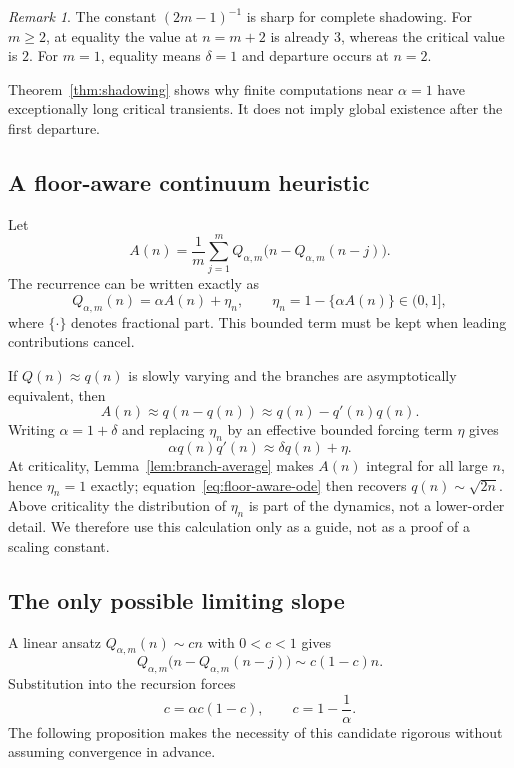 \documentclass[11pt]{article}
\theoremstyle{definition}
\theoremstyle{remark}
\newtheorem{remark}[theorem]{Remark}
\begin{document}
\begin{remark}
The constant $(2m-1)^{-1}$ is sharp for complete shadowing.  For $m\ge2$,
at equality the value at $n=m+2$ is already $3$, whereas the critical value
is $2$.  For $m=1$, equality means $\delta=1$ and departure occurs at $n=2$.
\end{remark}

Theorem~\ref{thm:shadowing} shows why finite computations near $\alpha=1$
have exceptionally long critical transients.  It does not imply global
existence after the first departure.

\subsection{A floor-aware continuum heuristic}

Let
\[
A(n)=\frac1m\sum_{j=1}^{m}
Q_{\alpha,m}\bigl(n-Q_{\alpha,m}(n-j)\bigr).
\]
The recurrence can be written exactly as
\begin{equation}\label{eq:floor-defect}
Q_{\alpha,m}(n)=\alpha A(n)+\eta_n,
\qquad
\eta_n=1-\{\alpha A(n)\}\in(0,1],
\end{equation}
where $\{\cdot\}$ denotes fractional part.  This bounded term must be kept
when leading contributions cancel.

If $Q(n)\approx q(n)$ is slowly varying and the branches are asymptotically
equivalent, then
\[
A(n)\approx q(n-q(n))
\approx q(n)-q'(n)q(n).
\]
Writing $\alpha=1+\delta$ and replacing $\eta_n$ by an effective bounded
forcing term $\eta$ gives
\begin{equation}\label{eq:floor-aware-ode}
\alpha q(n)q'(n)\approx \delta q(n)+\eta.
\end{equation}
At criticality, Lemma~\ref{lem:branch-average} makes $A(n)$ integral for all
large $n$, hence $\eta_n=1$ exactly; equation~\eqref{eq:floor-aware-ode}
then recovers $q(n)\sim\sqrt{2n}$.  Above criticality the distribution of
$\eta_n$ is part of the dynamics, not a lower-order detail.  We therefore
use this calculation only as a guide, not as a proof of a scaling constant.

\subsection{The only possible limiting slope}

A linear ansatz $Q_{\alpha,m}(n)\sim cn$ with $0<c<1$ gives
\[
Q_{\alpha,m}\bigl(n-Q_{\alpha,m}(n-j)\bigr)
\sim c(1-c)n.
\]
Substitution into the recursion forces
\[
c=\alpha c(1-c),
\qquad
c=1-\frac1\alpha.
\]
The following proposition makes the necessity of this candidate rigorous
without assuming convergence in advance.
\end{document}
